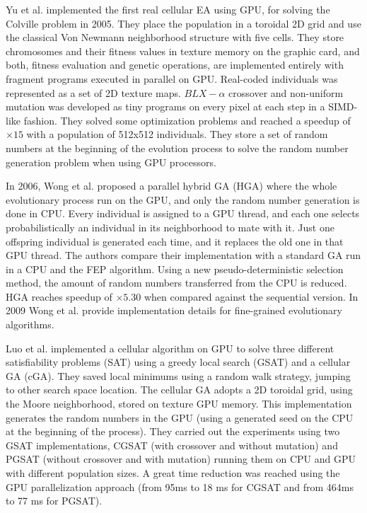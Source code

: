 \documentclass{comjnl}
\begin{document}
Yu et al. \cite{yu-parallel-2005} implemented the first real cellular EA using GPU, for solving the Colville problem \cite{Ng:2005:DFF:1064290.1064296} in 2005. They place the population in a toroidal 2D grid and use the classical Von Newmann neighborhood structure with five cells. They store chromosomes and their fitness values in texture memory on the graphic card, and both, fitness evaluation and genetic operations, are implemented entirely with fragment programs executed in parallel on GPU. Real-coded individuals was represented as a set of 2D texture maps. $BLX-\alpha$ crossover and non-uniform mutation was developed as tiny programs on every pixel at each step in a SIMD-like fashion. They solved some optimization problems and reached a speedup of $\times15$ with a population of 512x512 individuals. They store a set of random numbers at the beginning of the evolution process to solve the random number generation problem when using GPU processors. 

In 2006, Wong et al. \cite{man-leung-wong-parallel-2006} proposed a parallel hybrid GA (HGA) where the whole evolutionary process run on the GPU, and only the random number generation is done in CPU. Every individual is assigned to a GPU thread, and each one selects probabilistically an individual in its neighborhood to mate with it. Just one offspring individual is generated each time, and it replaces the old one in that GPU thread. The authors compare their implementation with a standard GA run in a CPU and the FEP \cite{man-leung-wong-parallel-2005} algorithm. Using a new pseudo-deterministic selection method, the amount of random numbers transferred from the CPU is reduced. HGA reaches speedup of $\times5.30$ when compared against the sequential version. In 2009 Wong et al. \cite{wong-implementation-2009} provide implementation details for fine-grained evolutionary algorithms.  

Luo et al. \cite{zhongwen-luo-cellular-2006} implemented a cellular algorithm on GPU to solve three different satisfiability problems (SAT) 
using a greedy local search (GSAT) \cite{Selman93domain-independentextensions} and a cellular GA (cGA). 
They saved local minimums using a random walk strategy, jumping to other search space location. 
The cellular GA adopts a 2D toroidal grid, using the Moore neighborhood, stored on texture GPU memory. This implementation generates the random numbers in the GPU (using a generated seed on the CPU at the beginning of the process). They carried out the experiments using two GSAT implementations, CGSAT (with crossover and without mutation) and PGSAT (without crossover and with mutation) running them on CPU and GPU with different population sizes. A great time reduction was reached using the GPU parallelization approach (from 95ms to 18 ms for CGSAT and from 464ms to 77 ms for PGSAT).
\end{document}
